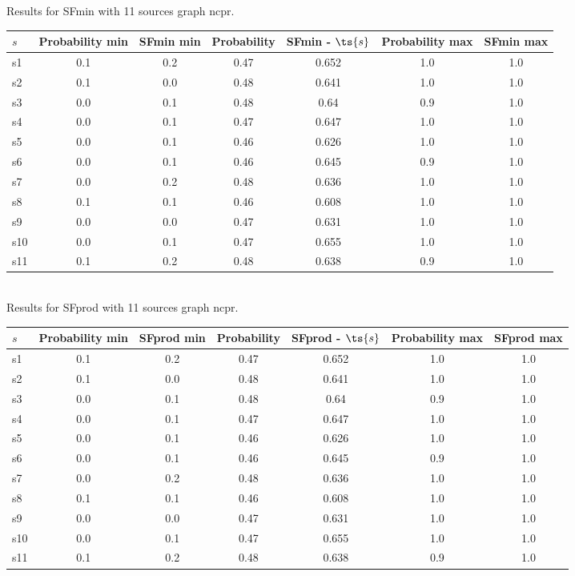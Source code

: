 \documentclass{article}
\begin{document}
\noindent Results for SFmin with 11 sources graph ncpr.

\noindent\begin{tabular}{|l|c|c|c|c|c|c|}
\hline
$s$& Probability min & SFmin min & Probability & SFmin - $\ts{s}$ & Probability max & SFmin max\\
\hline
s1 &0.1 & 0.2 & 0.47 & 0.652 & 1.0 & 1.0\\
\hline
s2 &0.1 & 0.0 & 0.48 & 0.641 & 1.0 & 1.0\\
\hline
s3 &0.0 & 0.1 & 0.48 & 0.64 & 0.9 & 1.0\\
\hline
s4 &0.0 & 0.1 & 0.47 & 0.647 & 1.0 & 1.0\\
\hline
s5 &0.0 & 0.1 & 0.46 & 0.626 & 1.0 & 1.0\\
\hline
s6 &0.0 & 0.1 & 0.46 & 0.645 & 0.9 & 1.0\\
\hline
s7 &0.0 & 0.2 & 0.48 & 0.636 & 1.0 & 1.0\\
\hline
s8 &0.1 & 0.1 & 0.46 & 0.608 & 1.0 & 1.0\\
\hline
s9 &0.0 & 0.0 & 0.47 & 0.631 & 1.0 & 1.0\\
\hline
s10 &0.0 & 0.1 & 0.47 & 0.655 & 1.0 & 1.0\\
\hline
s11 &0.1 & 0.2 & 0.48 & 0.638 & 0.9 & 1.0\\
\hline
\end{tabular}\\

\noindent Results for SFprod with 11 sources graph ncpr.

\noindent\begin{tabular}{|l|c|c|c|c|c|c|}
\hline
$s$& Probability min & SFprod min & Probability & SFprod - $\ts{s}$ & Probability max & SFprod max\\
\hline
s1 &0.1 & 0.2 & 0.47 & 0.652 & 1.0 & 1.0\\
\hline
s2 &0.1 & 0.0 & 0.48 & 0.641 & 1.0 & 1.0\\
\hline
s3 &0.0 & 0.1 & 0.48 & 0.64 & 0.9 & 1.0\\
\hline
s4 &0.0 & 0.1 & 0.47 & 0.647 & 1.0 & 1.0\\
\hline
s5 &0.0 & 0.1 & 0.46 & 0.626 & 1.0 & 1.0\\
\hline
s6 &0.0 & 0.1 & 0.46 & 0.645 & 0.9 & 1.0\\
\hline
s7 &0.0 & 0.2 & 0.48 & 0.636 & 1.0 & 1.0\\
\hline
s8 &0.1 & 0.1 & 0.46 & 0.608 & 1.0 & 1.0\\
\hline
s9 &0.0 & 0.0 & 0.47 & 0.631 & 1.0 & 1.0\\
\hline
s10 &0.0 & 0.1 & 0.47 & 0.655 & 1.0 & 1.0\\
\hline
s11 &0.1 & 0.2 & 0.48 & 0.638 & 0.9 & 1.0\\
\hline
\end{tabular}\\
\end{document}
